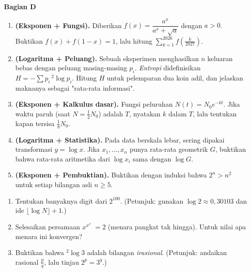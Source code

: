 \documentclass[11pt,a4paper]{report}
\theoremstyle{gaya}
\newcommand{\bagiansoal}[2]{%
  \par\medskip\noindent
  {\large\bfseries\color{biru}Bagian #1}\par\smallskip
  \addcontentsline{toc}{subsection}{Bagian #1}}
\begin{document}
\bagiansoal{D}{Expert (setara tahun pertama universitas --- sintesis antarbab)}
\begin{enumerate}[leftmargin=*]
  \item \textbf{(Eksponen + Fungsi).} Diberikan $f(x)=\dfrac{a^x}{a^x+\sqrt a}$ dengan $a>0$. Buktikan $f(x)+f(1-x)=1$, lalu hitung $\sum_{k=1}^{2026} f\!\left(\tfrac{k}{2027}\right)$.
  \item \textbf{(Logaritma + Peluang).} Sebuah eksperimen menghasilkan $n$ keluaran bebas dengan peluang masing-masing $p_i$. \emph{Entropi} didefinisikan $H=-\sum p_i\,{}^{2}\!\log p_i$. Hitung $H$ untuk pelemparan dua koin adil, dan jelaskan maknanya sebagai "rata-rata informasi".
  \item \textbf{(Eksponen + Kalkulus dasar).} Fungsi peluruhan $N(t)=N_0 e^{-kt}$. Jika waktu paruh (saat $N=\tfrac12 N_0$) adalah $T$, nyatakan $k$ dalam $T$, lalu tentukan kapan tersisa $\tfrac18 N_0$.
  \item \textbf{(Logaritma + Statistika).} Pada data berskala lebar, sering dipakai transformasi $y=\log x$. Jika $x_1,\dots,x_n$ punya rata-rata geometrik $G$, buktikan bahwa rata-rata aritmetika dari $\log x_i$ sama dengan $\log G$.
  \item \textbf{(Eksponen + Pembuktian).} Buktikan dengan induksi bahwa $2^n > n^2$ untuk setiap bilangan asli $n\ge 5$.
\end{enumerate}

\begin{challenge}
\begin{enumerate}[leftmargin=*,topsep=2pt]
  \item Tentukan banyaknya digit dari $2^{100}$. (Petunjuk: gunakan $\log 2 \approx 0{,}30103$ dan ide $\lfloor \log N\rfloor + 1$.)
  \item Selesaikan persamaan $x^{x^{x^{\cdot^{\cdot^{\cdot}}}}}=2$ (menara pangkat tak hingga). Untuk nilai apa menara ini konvergen?
  \item Buktikan bahwa ${}^{2}\!\log 3$ adalah bilangan \emph{irasional}. (Petunjuk: andaikan rasional $\tfrac{p}{q}$, lalu tinjau $2^p=3^q$.)
\end{enumerate}
\end{challenge}

\end{document}
